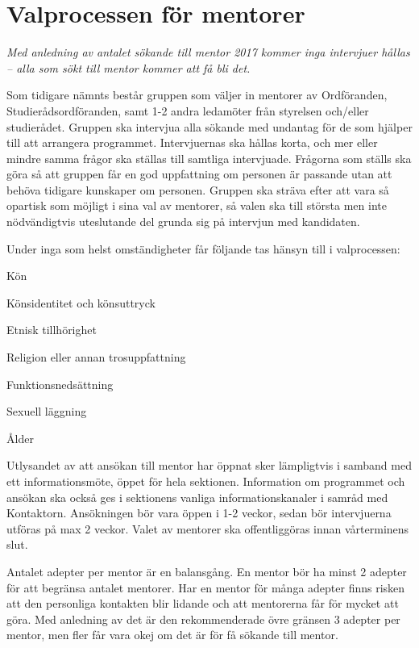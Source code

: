 \documentclass[10pt]{article}
\begin{document}
    \newpage

    \section{Valprocessen för mentorer}
    \emph{Med anledning av antalet sökande till mentor 2017 kommer inga intervjuer hållas -- alla som sökt till mentor kommer att få bli det.}

    Som tidigare nämnts består gruppen som väljer in mentorer av Ordföranden, Studierådsordföranden, samt 1-2 andra ledamöter från styrelsen och/eller studierådet.
    Gruppen ska intervjua alla sökande med undantag för de som hjälper till att arrangera programmet.
    Intervjuernas ska hållas korta, och mer eller mindre samma frågor ska ställas till samtliga intervjuade.
    Frågorna som ställs ska göra så att gruppen får en god uppfattning om personen är passande utan att behöva tidigare kunskaper om personen.
    Gruppen ska sträva efter att vara så opartisk som möjligt i sina val av mentorer, så valen ska till största men inte nödvändigtvis uteslutande del grunda sig på intervjun med kandidaten.

    Under inga som helst omständigheter får följande tas hänsyn till i valprocessen:
    \begin{dashlist}
        \item Kön
        \item Könsidentitet och könsuttryck
        \item Etnisk tillhörighet
        \item Religion eller annan trosuppfattning
        \item Funktionsnedsättning
        \item Sexuell läggning
        \item Ålder
    \end{dashlist}

    Utlysandet av att ansökan till mentor har öppnat sker lämpligtvis i samband med ett informationsmöte, öppet för hela sektionen.
    Information om programmet och ansökan ska också ges i sektionens vanliga informationskanaler i samråd med Kontaktorn.
    Ansökningen bör vara öppen i 1-2 veckor, sedan bör intervjuerna utföras på max 2 veckor.
    Valet av mentorer ska offentliggöras innan vårterminens slut.

    Antalet adepter per mentor är en balansgång.
    En mentor bör ha minst 2 adepter för att begränsa antalet mentorer.
    Har en mentor för många adepter finns risken att den personliga kontakten blir lidande och att mentorerna får för mycket att göra.
    Med anledning av det är den rekommenderade övre gränsen 3 adepter per mentor, men fler får vara okej om det är för få sökande till mentor.
\end{document}
